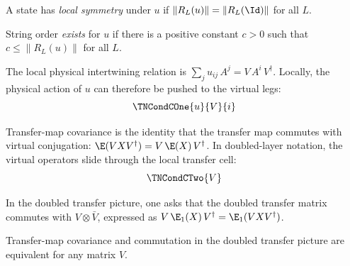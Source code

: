 \begin{definition}\label{def:local_symmetry}
    \leanok
    A state has \emph{local symmetry} under $u$ if
    $\|R_L(u)\| = \|R_L(\Id)\|$ for all $L$.
\end{definition}

\begin{definition}\label{def:has_string_order}
    \leanok
    String order \emph{exists} for $u$ if there is a positive
    constant $c > 0$ such that $c \le \|R_L(u)\|$ for all $L$.
\end{definition}

\begin{definition}\label{def:condC1}
    \leanok
    The local physical intertwining relation is
    $\sum_j u_{ij}\, A^j = V\, A^i\, V^\dagger$.
    Locally, the physical action of $u$ can therefore be pushed to the virtual
    legs:
    \[
        \TNCondCOne{u}{V}{i}
    \]
\end{definition}

\begin{definition}\label{def:condC2}
    \leanok
    Transfer-map covariance is the identity that the transfer map commutes with virtual
    conjugation: $\E(V X V^\dagger) = V\, \E(X)\, V^\dagger$.
    In doubled-layer notation, the virtual operators slide through the local
    transfer cell:
    \[
        \TNCondCTwo{V}
    \]
\end{definition}

\begin{definition}\label{def:condC3}
    \leanok
    In the doubled transfer picture, one asks that the doubled transfer matrix commutes with
    $V \otimes \bar V$, expressed as
    $V\, \E_1(X)\, V^\dagger = \E_1(V X V^\dagger)$.
\end{definition}

\begin{theorem}\label{thm:condC2_iff_condC3}
    \leanok
    Transfer-map covariance and commutation in the doubled transfer
    picture are equivalent for any matrix $V$.
\end{theorem}

